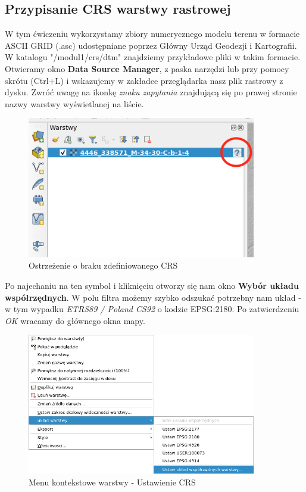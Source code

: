 \documentclass[a4paper,11pt, onecolumn, openany]{memoir}
\begin{document}
		\subsection{Przypisanie CRS warstwy rastrowej}
		W tym ćwiczeniu wykorzystamy zbiory numerycznego modelu terenu w formacie ASCII GRID (.asc) udostępniane poprzez Główny Urząd Geodezji i Kartografii. 
		W katalogu "/modul1/crs/dtm" znajdziemy przykładowe pliki w takim formacie. Otwieramy okno \textbf{Data Source Manager}, z paska narzędzi lub przy pomocy skrótu (Ctrl+L) i wskazujemy w zakładce przeglądarka nasz plik rastrowy z dysku. 
		Zwróć uwagę na ikonkę \emph{znaku zapytania} znajdującą się po prawej stronie nazwy warstwy wyświetlanej na liście.
		\begin{figure}[!ht]
			\centering
			\includegraphics[width=10cm]{crs-cwiczenie1-brak-crs}
			\caption{Ostrzeżenie o braku zdefiniowanego CRS}
		\end{figure} 
	Po najechaniu na ten symbol i kliknięciu otworzy się nam okno \textbf{Wybór układu współrzędnych}. W polu filtra możemy szybko odszukać potrzebny nam układ - w tym wypadku \emph{ETRS89 / Poland CS92} o kodzie EPSG:2180. Po zatwierdzeniu \emph{OK} wracamy do głównego okna mapy.
	\begin{figure}[!ht]
    	\centering
	    \includegraphics[width=10cm]{crs-cwiczenie1-menu-kontekstowe}
    	\caption{Menu kontekstowe warstwy - Ustawienie CRS}
    \end{figure} 
\end{document}
